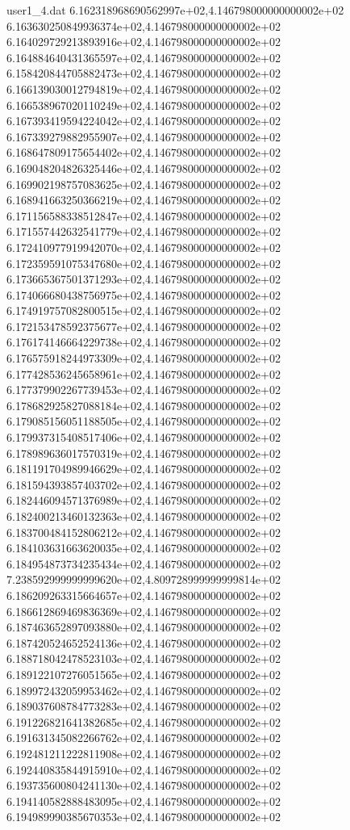 \begin{filecontents}{user1_4.dat}
6.162318968690562997e+02,4.146798000000000002e+02
6.163630250849936374e+02,4.146798000000000002e+02
6.164029729213893916e+02,4.146798000000000002e+02
6.164884640431365597e+02,4.146798000000000002e+02
6.158420844705882473e+02,4.146798000000000002e+02
6.166139030012794819e+02,4.146798000000000002e+02
6.166538967020110249e+02,4.146798000000000002e+02
6.167393419594224042e+02,4.146798000000000002e+02
6.167339279882955907e+02,4.146798000000000002e+02
6.168647809175654402e+02,4.146798000000000002e+02
6.169048204826325446e+02,4.146798000000000002e+02
6.169902198757083625e+02,4.146798000000000002e+02
6.168941663250366219e+02,4.146798000000000002e+02
6.171156588338512847e+02,4.146798000000000002e+02
6.171557442632541779e+02,4.146798000000000002e+02
6.172410977919942070e+02,4.146798000000000002e+02
6.172359591075347680e+02,4.146798000000000002e+02
6.173665367501371293e+02,4.146798000000000002e+02
6.174066680438756975e+02,4.146798000000000002e+02
6.174919757082800515e+02,4.146798000000000002e+02
6.172153478592375677e+02,4.146798000000000002e+02
6.176174146664229738e+02,4.146798000000000002e+02
6.176575918244973309e+02,4.146798000000000002e+02
6.177428536245658961e+02,4.146798000000000002e+02
6.177379902267739453e+02,4.146798000000000002e+02
6.178682925827088184e+02,4.146798000000000002e+02
6.179085156051188505e+02,4.146798000000000002e+02
6.179937315408517406e+02,4.146798000000000002e+02
6.178989636017570319e+02,4.146798000000000002e+02
6.181191704989946629e+02,4.146798000000000002e+02
6.181594393857403702e+02,4.146798000000000002e+02
6.182446094571376989e+02,4.146798000000000002e+02
6.182400213460132363e+02,4.146798000000000002e+02
6.183700484152806212e+02,4.146798000000000002e+02
6.184103631663620035e+02,4.146798000000000002e+02
6.184954873734235434e+02,4.146798000000000002e+02
7.238592999999999620e+02,4.809728999999999814e+02
6.186209263315664657e+02,4.146798000000000002e+02
6.186612869469836369e+02,4.146798000000000002e+02
6.187463652897093880e+02,4.146798000000000002e+02
6.187420524652524136e+02,4.146798000000000002e+02
6.188718042478523103e+02,4.146798000000000002e+02
6.189122107276051565e+02,4.146798000000000002e+02
6.189972432059953462e+02,4.146798000000000002e+02
6.189037608784773283e+02,4.146798000000000002e+02
6.191226821641382685e+02,4.146798000000000002e+02
6.191631345082266762e+02,4.146798000000000002e+02
6.192481211222811908e+02,4.146798000000000002e+02
6.192440835844915910e+02,4.146798000000000002e+02
6.193735600804241130e+02,4.146798000000000002e+02
6.194140582888483095e+02,4.146798000000000002e+02
6.194989990385670353e+02,4.146798000000000002e+02

\end{filecontents}
